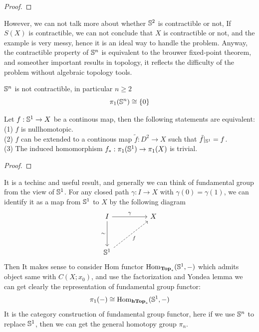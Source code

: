 \documentclass[12pt,a4paper]{article}
\begin{document}
\begin{proof}
    
\end{proof}

However, we can not talk more about whether \(\mathbb{S}^2\) is contractible or not, If \(S(X)\) is contractible, we can not conclude that \(X\) is contractible or not, and the example is very messy, hence it is an ideal way to handle the problem. Anyway, the contractible property of \(\mathbb{S}^n\) is equivalent to the brouwer fixed-point theorem, and someother important results in topology, it reflects the difficulty of the problem without algebraic topology tools.
\begin{claim} 
    \(\mathbb{S}^n\) is not contractible, in particular \(n \geq 2\)
    \[\pi_1(\mathbb{S}^n) \cong \{0\}\]
\end{claim}


\begin{theorem}
    Let \(f:\mathbb{S}^1 \to X\) be a continous map, then the following statements are equivalent:\\

    (1) \(f\) is nullhomotopic.\\

    (2) \(f\) can be extended to a continous map \(\tilde{f}:D^2 \to X\) such that \(\tilde{f}|_{\mathbb{S}^1} = f\).\\

    (3) The induced homomorphism \(f_*:\pi_1(\mathbb{S}^1) \to \pi_1(X)\) is trivial.

\end{theorem}
\begin{proof}
    
\end{proof}

\begin{remark}
    It is a techinc and useful result, and generally we can think of fundamental group from the view of \(\mathbb{S}^1\). For any closed path \(\gamma:I \to X\) with \(\gamma(0) = \gamma(1)\), we can identify it as a map from \(\mathbb{S}^1\) to \(X\) by the following diagram
\[\begin{tikzcd}
	I && X \\
	\\
	{\mathbb{S}^1}
	\arrow["\gamma", from=1-1, to=1-3]
	\arrow["\sim"', from=1-1, to=3-1]
	\arrow["{f}"', dashed, from=3-1, to=1-3]
\end{tikzcd}\]
    Then It makes sense to consider Hom functor \(\operatorname{Hom}_{\mathbf{Top}_*}(\mathbb{S}^1,-)\) which admits object same with \(C(X;x_0)\), and use the factorization and Yondea lemma we can get clearly the representation of fundamental group functor:
    \[\pi_1(-) \cong \operatorname{Hom}_{\mathbf{hTop}_*}(\mathbb{S}^1,-)\]
    It is the category construction of fundamental group functor, here if we use \(\mathbb{S}^n\) to replace \(\mathbb{S}^1\), then we can get the general homotopy group \(\pi_n\).

\end{remark}
\end{document}

